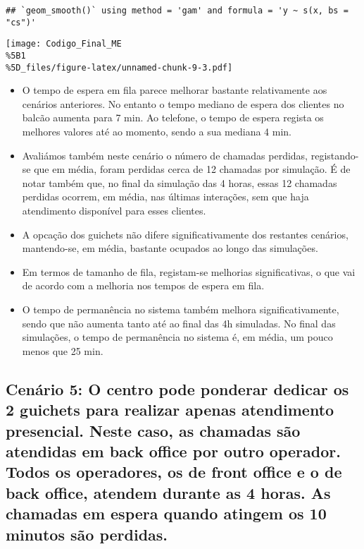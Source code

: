 \documentclass[
]{article}
\providecommand{\tightlist}{%
  \setlength{\itemsep}{0pt}\setlength{\parskip}{0pt}}
\begin{document}
\begin{verbatim}
## `geom_smooth()` using method = 'gam' and formula = 'y ~ s(x, bs = "cs")'
\end{verbatim}

\texttt{[image: Codigo\_Final\_ME\\\%5B1\\\%5D\_files/figure-latex/unnamed-chunk-9-3.pdf]}

\begin{itemize}
\tightlist
\item
  O tempo de espera em fila parece melhorar bastante relativamente aos
  cenários anteriores. No entanto o tempo mediano de espera dos clientes
  no balcão aumenta para 7 min. Ao telefone, o tempo de espera regista
  os melhores valores até ao momento, sendo a sua mediana 4 min.
\item
  Avaliámos também neste cenário o número de chamadas perdidas,
  registando-se que em média, foram perdidas cerca de 12 chamadas por
  simulação. É de notar também que, no final da simulação das 4 horas,
  essas 12 chamadas perdidas ocorrem, em média, nas últimas interações,
  sem que haja atendimento disponível para esses clientes.
\item
  A opcação dos guichets não difere significativamente dos restantes
  cenários, mantendo-se, em média, bastante ocupados ao longo das
  simulações.
\item
  Em termos de tamanho de fila, registam-se melhorias significativas, o
  que vai de acordo com a melhoria nos tempos de espera em fila.
\item
  O tempo de permanência no sistema também melhora significativamente,
  sendo que não aumenta tanto até ao final das 4h simuladas. No final
  das simulações, o tempo de permanência no sistema é, em média, um
  pouco menos que 25 min.
\end{itemize}

\subsection{Cenário 5: O centro pode ponderar dedicar os 2 guichets para
realizar apenas atendimento presencial. Neste caso, as chamadas são
atendidas em back office por outro operador. Todos os operadores, os de
front office e o de back office, atendem durante as 4 horas. As chamadas
em espera quando atingem os 10 minutos são
perdidas.}\label{cenuxe1rio-5-o-centro-pode-ponderar-dedicar-os-2-guichets-para-realizar-apenas-atendimento-presencial.-neste-caso-as-chamadas-suxe3o-atendidas-em-back-office-por-outro-operador.-todos-os-operadores-os-de-front-office-e-o-de-back-office-atendem-durante-as-4-horas.-as-chamadas-em-espera-quando-atingem-os-10-minutos-suxe3o-perdidas.}
\end{document}
